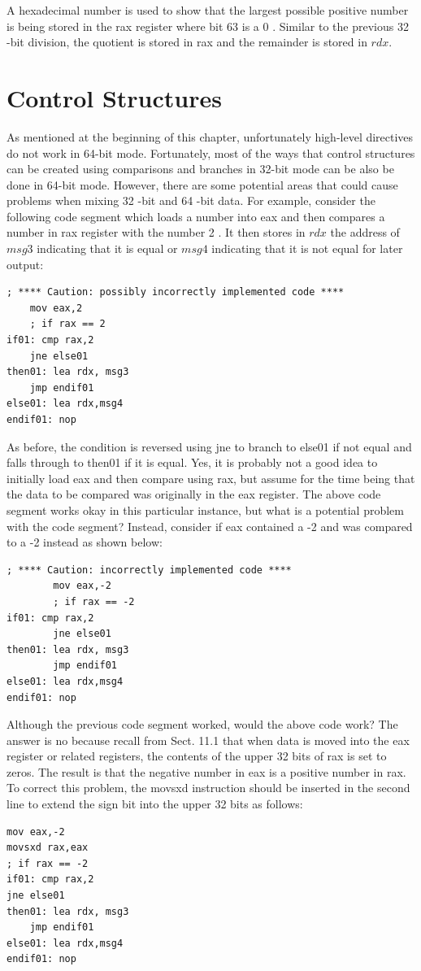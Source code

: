 \documentclass[10pt]{book}
\begin{document}
A hexadecimal number is used to show that the largest possible positive number is being stored in the rax register where bit 63 is a 0 . Similar to the previous 32 -bit division, the quotient is stored in rax and the remainder is stored in $rdx$.

\section{Control Structures}
As mentioned at the beginning of this chapter, unfortunately high-level directives do not work in 64-bit mode. Fortunately, most of the ways that control structures can be created using comparisons and branches in 32-bit mode can be also be done in 64-bit mode. However, there are some potential areas that could cause problems when mixing 32 -bit and 64 -bit data. For example, consider the following code segment which loads a number into eax and then compares a number in rax register with the number 2 . It then stores in $rdx$ the address of $msg3$ indicating that it is equal or $msg4$ indicating that it is not equal for later output:

\begin{verbatim}
; **** Caution: possibly incorrectly implemented code ****
    mov eax,2
    ; if rax == 2
if01: cmp rax,2
    jne else01
then01: lea rdx, msg3
    jmp endif01
else01: lea rdx,msg4
endif01: nop
\end{verbatim}

As before, the condition is reversed using jne to branch to else01 if not equal and falls through to then01 if it is equal. Yes, it is probably not a good idea to initially load eax and then compare using rax, but assume for the time being that the data to be compared was originally in the eax register. The above code segment works okay in this particular instance, but what is a potential problem with the code segment? Instead, consider if eax contained a -2 and was compared to a -2 instead as shown below:

\begin{verbatim}
; **** Caution: incorrectly implemented code ****
        mov eax,-2
        ; if rax == -2
if01: cmp rax,2
        jne else01
then01: lea rdx, msg3
        jmp endif01
else01: lea rdx,msg4
endif01: nop
\end{verbatim}

Although the previous code segment worked, would the above code work? The answer is no because recall from Sect. 11.1 that when data is moved into the eax register or related registers, the contents of the upper 32 bits of rax is set to zeros. The result is that the negative number in eax is a positive number in rax. To correct this problem, the movsxd instruction should be inserted in the second line to extend the sign bit into the upper 32 bits as follows:
\begin{verbatim}
mov eax,-2
movsxd rax,eax
; if rax == -2
if01: cmp rax,2
jne else01
then01: lea rdx, msg3
    jmp endif01
else01: lea rdx,msg4
endif01: nop
\end{verbatim}
\end{document}
